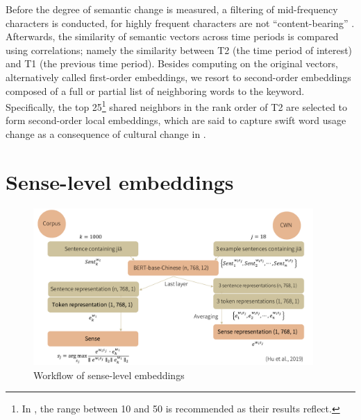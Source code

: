 Before the degree of semantic change is measured, a filtering of mid-frequency characters is conducted, for highly frequent characters are not ``content-bearing'' \parencite{hamilton2016cultural,rodda2017panta}. Afterwards, the similarity of semantic vectors across time periods is compared using correlations; namely the similarity between T2 (the time period of interest) and T1 (the previous time period). Besides computing on the original vectors, alternatively called first-order embeddings, we resort to second-order embeddings composed of a full or partial list of neighboring words to the keyword. Specifically, the top 25\footnote{In \textcite{hamilton2016cultural}, the range between 10 and 50 is recommended as their results reflect.} shared neighbors in the rank order of T2 are selected to form second-order local embeddings, which are said to capture swift word usage change as a consequence of cultural change in \textcite{hamilton2016cultural}.

\section{Sense-level embeddings}

\begin{figure}[H]
  \centering
  \includegraphics[height=0.4\textheight,width=0.95\textwidth,keepaspectratio]{figures_new/from_slides/workflow_sense_level.pdf}
  \caption{Workflow of sense-level embeddings}
  \label{fig:workflow_sense_level}
\end{figure}

